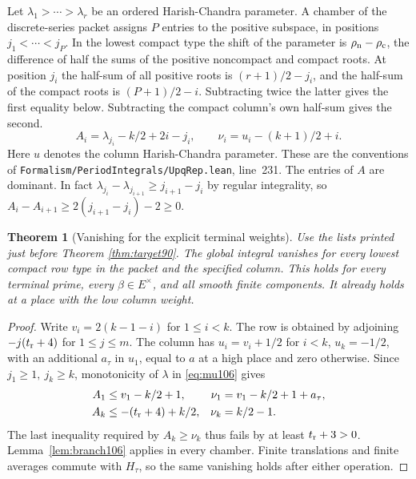 \documentclass[a4paper,11pt]{article}
\newtheorem{theorem}[proposition]{Theorem}
\theoremstyle{definition}
\theoremstyle{remark}
\newcommand{\srcloc}[2]{{\small\nolinkurl{#1.lean}}, line~#2}
\numberwithin{equation}{section}
\begin{document}
Let \(\lambda_1>\cdots>\lambda_r\) be an ordered Harish-Chandra
parameter. A chamber of the discrete-series packet assigns \(P\)
entries to the positive subspace, in positions \(j_1<\cdots<j_P\).
In the lowest compact type the shift of the parameter is
\(\rho_{\rm n}-\rho_{\rm c}\), the difference of half the sums of
the positive noncompact and compact roots. At position \(j_i\) the
half-sum of all positive roots is \((r+1)/2-j_i\), and the half-sum of
the compact roots is \((P+1)/2-i\). Subtracting twice the latter
gives the first equality below. Subtracting the compact column's
own half-sum gives the second.
\begin{equation}
 A_i=\lambda_{j_i}-k/2+2i-j_i,\qquad
 \nu_i=u_i-(k+1)/2+i.                            \label{eq:mu106}
\end{equation}
Here \(u\) denotes the column Harish-Chandra parameter. These are
the conventions of \srcloc{Formalism/PeriodIntegrals/UpqRep}{231}.
The entries of \(A\) are dominant. In fact
\(\lambda_{j_i}-\lambda_{j_{i+1}}\ge j_{i+1}-j_i\) by regular
integrality, so \(A_i-A_{i+1}\ge 2(j_{i+1}-j_i)-2\ge0\).

\begin{theorem}[Vanishing for the explicit terminal weights]\label{thm:zero106}
Use the lists printed just before
Theorem \ref{thm:target90}.
The global integral vanishes for every lowest compact row type in
the packet and the specified column. This holds for every terminal
prime, every \(\beta\in E^\times\), and all smooth finite components.
It already holds at a place with the low column weight.
\end{theorem}
\begin{proof}
Write \(v_i=2(k-1-i)\) for \(1\le i<k\). The row is obtained by
adjoining \(-j(t_{\rm r}+4)\) for \(1\le j\le m\). The column
has \(u_i=v_i+1/2\) for \(i<k\), \(u_k=-1/2\), with an additional
\(a_\tau\) in \(u_1\), equal to \(a\) at a high place and zero
otherwise. Since \(j_1\ge1,\ j_k\ge k\), monotonicity of \(\lambda\)
in \eqref{eq:mu106} gives
\[
 \begin{aligned}
 A_1&\le v_1-k/2+1,            &\nu_1&=v_1-k/2+1+a_\tau,\\
 A_k&\le -(t_{\rm r}+4)+k/2,  &\nu_k&=k/2-1 .
 \end{aligned}
\]
The last inequality required by \(A_k\ge\nu_k\) thus fails by
at least \(t_{\rm r}+3>0\). Lemma~\ref{lem:branch106} applies
in every chamber. Finite translations and finite averages commute
with \(H_\tau\), so the same vanishing holds after either operation.
\end{proof}
\end{document}
